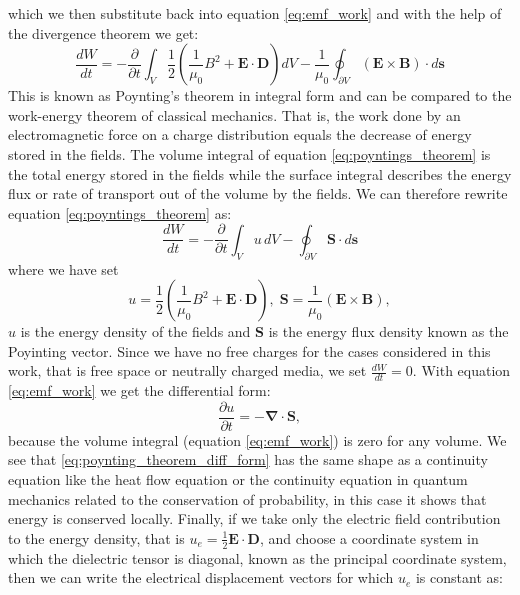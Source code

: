 which we then substitute back into equation \ref{eq:emf_work} and with the help of the divergence theorem we get:
\begin{equation}
    \label{eq:poyntings_theorem}
    \frac{dW}{dt} = -\frac{\partial}{\partial t} \int_V \frac{1}{2}\left(\frac{1}{\mu_0}B^2+\bm{E}\cdot\bm{D}\right)dV -\frac{1}{\mu_0}\oint_{\partial V} (\bm{E}\times\bm{B}) \cdot d\bm{s}
\end{equation}
This is known as Poynting's theorem in integral form and can be compared to the work-energy theorem of classical mechanics. That is, the work done by an electromagnetic force on a charge distribution equals the decrease of energy stored in the fields. The volume integral of equation \ref{eq:poyntings_theorem} is the total energy stored in the fields while the surface integral describes the energy flux or rate of transport out of the volume by the fields. We can therefore rewrite equation \ref{eq:poyntings_theorem} as:
\begin{equation}
    \frac{dW}{dt} = -\frac{\partial}{\partial t} \int_V u\, dV -\oint_{\partial V} \bm{S} \cdot d\bm{s}
\end{equation}
where we have set
\begin{equation}
    u = \frac{1}{2}\left(\frac{1}{\mu_0}B^2+\bm{E}\cdot\bm{D}\right),\; \bm{S} = \frac{1}{\mu_0}(\bm{E}\times\bm{B}),
\end{equation}
$u$ is the energy density of the fields and $\bm{S}$ is the energy flux density known as the Poyinting vector. Since we have no free charges for the cases considered in this work, that is free space or neutrally charged media, we set $\frac{dW}{dt}=0$. With equation \ref{eq:emf_work} we get the differential form:
\begin{equation}
    \label{eq:poynting_theorem_diff_form}
    \frac{\partial u}{\partial t} = -\bm{\nabla} \cdot \bm{S},
\end{equation}
because the volume integral (equation \ref{eq:emf_work}) is zero for any volume. We see that \ref{eq:poynting_theorem_diff_form} has the same shape as a continuity equation like the heat flow equation or the continuity equation in quantum mechanics related to the conservation of probability, in this case it shows that energy is conserved locally. Finally, if we take only the electric field contribution to the energy density, that is $u_e = \frac{1}{2}\bm{E}\cdot\bm{D}$, and choose a coordinate system in which the dielectric tensor is diagonal, known as the principal coordinate system, then we can write the electrical displacement vectors for which $u_e$ is constant as:
